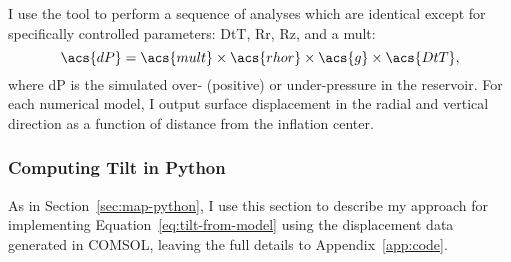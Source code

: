 I use the  tool to perform a sequence of analyses which are identical except for specifically controlled parameters: \ac{DtT}, \ac{Rr}, \ac{Rz}, and a \ac{mult}:
\begin{equation}
    \acs{dP}=\acs{mult}\times\acs{rhor}\times\acs{g}\times\acs{DtT},
\end{equation}
where \acs{dP} is the simulated over- (positive) or under-pressure in the reservoir. For each numerical model, I output surface displacement in the radial and vertical direction as a function of distance from the inflation center. 

\subsubsection{Computing Tilt in Python}

As in Section~\ref{sec:map-python}, I use this section to describe my approach for implementing Equation~\eqref{eq:tilt-from-model} using the displacement data generated in COMSOL, leaving the full details to Appendix~\ref{app:code}.

